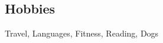 \documentclass[margin,line]{resume}
\begin{document}
\begin{resume}

\vspace{1mm}
\section{\mysidestyle Hobbies}
Travel, Languages, Fitness, Reading, Dogs

\end{resume}
\end{document}
